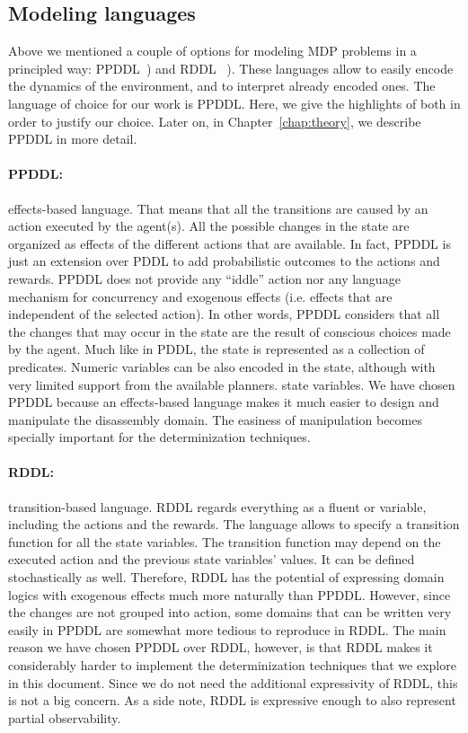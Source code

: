 \documentclass[../root.tex]{subfiles}
\begin{document}
\subsection{Modeling languages}

Above we mentioned a couple of options for modeling MDP
problems in a principled way: PPDDL~\cite{younes2004ppddl1}) and RDDL%
~\cite{sanner2010relational}). These languages allow to easily encode
the dynamics of the environment, and to interpret already encoded
ones. The language of choice for
our work is PPDDL. Here, we give the highlights of both in order
to justify our choice.
Later on, in Chapter~\ref{chap:theory}, we describe PPDDL in more detail.

\paragraph{PPDDL:} effects-based language. That means that
all the transitions are caused by an action executed by the agent(s). All
the possible changes in the state are organized as effects
of the different actions that are available. In fact, PPDDL is just an extension
over PDDL to add probabilistic outcomes to the actions and rewards. PPDDL does not provide any ``iddle'' action nor any language mechanism
for concurrency and exogenous effects (i.e.
effects that are independent of the selected action).
In other words, PPDDL considers that all the changes that may occur in the
state are the result of conscious choices made by the agent.
Much like in PDDL, the state is represented as a collection
of predicates. Numeric variables can be also encoded in the state, although with
very limited support from the available planners.
state variables. We have chosen PPDDL because an effects-based language
makes it much easier to design and
manipulate the disassembly domain.
The easiness of manipulation becomes specially important for
the determinization techniques.

\paragraph{RDDL:} transition-based language. RDDL regards everything as a
fluent or variable, including the actions and the rewards. The language allows
to specify a transition function for all the state variables. The transition
function may depend on the executed action and the previous state variables'
values. It can be defined stochastically as well. Therefore, RDDL has
the potential of expressing domain logics
with exogenous effects much more naturally than PPDDL. However, since the
changes are not grouped into action, some domains that can be written very
easily in PPDDL are somewhat more tedious to reproduce in RDDL. The main
reason we have chosen PPDDL over RDDL, however, is that RDDL makes it
considerably harder to implement the determinization techniques that we
explore in this document. Since we do not need the additional expressivity
of RDDL, this is not a big concern. As a side note, RDDL is expressive
enough to also represent partial observability.
\end{document}
